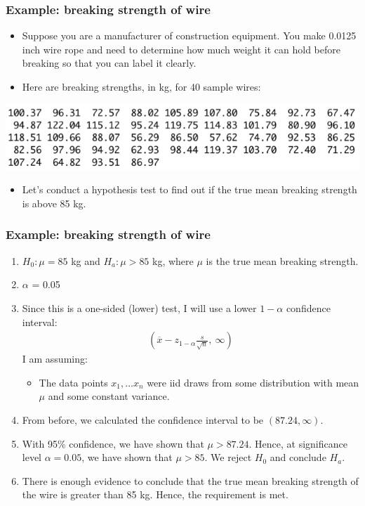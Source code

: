 \documentclass[handout]{beamer}\usepackage{graphicx, color}
\providecommand{\ov}[1]{\overline{#1}}
\numberwithin{equation}{section}
\begin{document}
\begin{frame}
\frametitle{Example: breaking strength of wire}
\begin{itemize}
\item Suppose you are a manufacturer of construction equipment. You make 0.0125 inch wire rope and need to determine how much weight it can hold before breaking so that you can label it clearly.
\pause \item Here are breaking strengths, in kg, for 40 sample wires:
\end{itemize}
 \includegraphics{../../fig/wiredata.png}
\begin{itemize}
\pause \item Let's conduct a hypothesis test to find out if the true mean breaking strength is above 85 kg.
\end{itemize}
\end{frame}

\begin{frame}
\frametitle{Example: breaking strength of wire} \scriptsize
\begin{enumerate}[1. ]
\item $H_0: \mu = 85$ kg and $H_a: \mu > 85$ kg, where $\mu$ is the true mean breaking strength.
\pause \item $\alpha$ = 0.05
\pause \item Since this is a one-sided (lower) test, I will use a lower $1 - \alpha$ confidence interval:
\begin{align*}
\left (\ov{x} - z_{1 - \alpha} \frac{s}{\sqrt{n}}, \ \infty \right )
\end{align*}
\pause I am assuming:
\begin{itemize}
\pause \item The data points $x_1, \ldots x_n$ were iid draws from some distribution with mean $\mu$ and some constant variance.
\end{itemize}
\pause \item From before, we calculated the confidence interval to be $(87.24, \infty)$.
\pause \item With 95\% confidence, we have shown that $\mu > 87.24$. Hence, at significance level $\alpha = 0.05$, we have shown that $\mu > 85$. We reject $H_0$ and conclude $H_a$.
\pause \item There is enough evidence to conclude that the true mean breaking strength of the wire is greater than 85 kg. Hence, the requirement is met.
\end{enumerate}
\end{frame}
\end{document}
